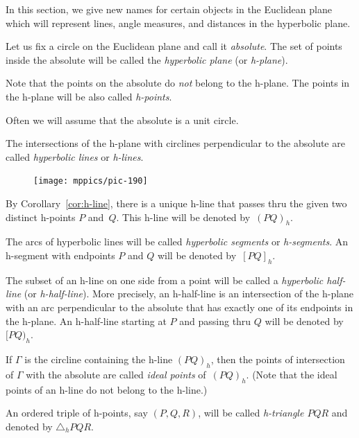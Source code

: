 In this section, we give new names for certain objects in the Euclidean plane
which will represent lines, angle measures, and distances in the hyperbolic plane.

Let us fix a circle on the Euclidean plane 
and call it \emph{absolute}.
The set of points inside the absolute will be called the \emph{hyperbolic plane} (or \emph{h-plane}).

Note that the points on the absolute do \textit{not} belong to the h-plane.
The points in the h-plane will be also called \emph{h-points}.

Often we will assume that the absolute is a unit circle.



The intersections of the h-plane with circlines perpendicular to the absolute are called {}\emph{hyperbolic lines} or \emph{h-lines}.

\begin{figure}
\centering
\texttt{[image: mppics/pic-190]}
\end{figure}

By Corollary~\ref{cor:h-line}, there is a unique h-line that passes thru the given two distinct h-points $P$ and~$Q$.
This h-line will be denoted by~\index{62@$(PQ)_h$, $[PQ)_h$,$[PQ]_h$}$(PQ)_h$.

The arcs of hyperbolic lines will be called {}\emph{hyperbolic segments} or \emph{h-segments}.
An h-segment with endpoints $P$ and $Q$ will be denoted by~$[PQ]_h$.

The subset of an h-line on one side from a point will be called a {}\emph{hyperbolic half-line} (or \emph{h-half-line}).
More precisely, an h-half-line is an intersection of the h-plane with an arc perpendicular to the absolute that has exactly one of its endpoints in the h-plane.
An h-half-line starting at $P$ and passing thru $Q$ will be denoted by~$[PQ)_h$.

If $\Gamma$ is the circline containing the h-line $(PQ)_h$, then the points of intersection of $\Gamma$ with the absolute are called 
\emph{ideal points} of~$(PQ)_h$.
(Note that the ideal points of an h-line do not belong to the h-line.)

An ordered triple of h-points, say $(P,Q,R)$, will be called {}\emph{h-triangle $PQR$} and denoted by $\triangle_h P Q R$.

